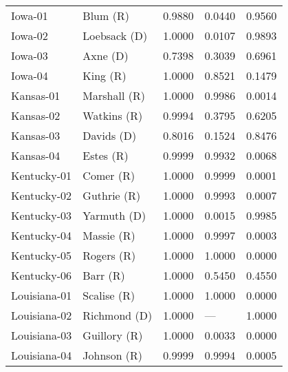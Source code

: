 \begin{longtable}{llrll}
           Iowa-01 &             {\color{Red} Blum (R)} &       0.9880 &        0.0440 &        0.9560 \\
           Iowa-02 &        {\color{Blue} Loebsack (D)} &       1.0000 &        0.0107 &        0.9893 \\
           Iowa-03 &            {\color{Blue} Axne (D)} &       0.7398 &        0.3039 &        0.6961 \\
           Iowa-04 &             {\color{Red} King (R)} &       1.0000 &        0.8521 &        0.1479 \\
         Kansas-01 &         {\color{Red} Marshall (R)} &       1.0000 &        0.9986 &        0.0014 \\
         Kansas-02 &          {\color{Red} Watkins (R)} &       0.9994 &        0.3795 &        0.6205 \\
         Kansas-03 &          {\color{Blue} Davids (D)} &       0.8016 &        0.1524 &        0.8476 \\
         Kansas-04 &            {\color{Red} Estes (R)} &       0.9999 &        0.9932 &        0.0068 \\
       Kentucky-01 &            {\color{Red} Comer (R)} &       1.0000 &        0.9999 &        0.0001 \\
       Kentucky-02 &          {\color{Red} Guthrie (R)} &       1.0000 &        0.9993 &        0.0007 \\
       Kentucky-03 &         {\color{Blue} Yarmuth (D)} &       1.0000 &        0.0015 &        0.9985 \\
       Kentucky-04 &           {\color{Red} Massie (R)} &       1.0000 &        0.9997 &        0.0003 \\
       Kentucky-05 &           {\color{Red} Rogers (R)} &       1.0000 &        1.0000 &        0.0000 \\
       Kentucky-06 &             {\color{Red} Barr (R)} &       1.0000 &        0.5450 &        0.4550 \\
      Louisiana-01 &          {\color{Red} Scalise (R)} &       1.0000 &        1.0000 &        0.0000 \\
      Louisiana-02 &        {\color{Blue} Richmond (D)} &       1.0000 &           --- &        1.0000 \\
      Louisiana-03 &         {\color{Red} Guillory (R)} &       1.0000 &        0.0033 &        0.0000 \\
      Louisiana-04 &          {\color{Red} Johnson (R)} &       0.9999 &        0.9994 &        0.0005 \\

\end{longtable}
